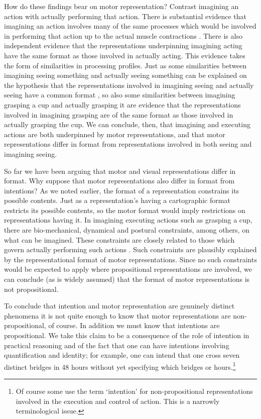 \documentclass[12pt,\papersize]{extarticle}
\begin{document}
How do these findings bear on motor representation? Contrast imagining an action with actually performing that action. There is substantial evidence that imagining an action involves many of the same processes which would be involved in performing that action up to the actual muscle contractions \citep{jeannerod:1995_mental,jeannerod:2003_mechanism}. There is also independent evidence that the representations underpinning imagining acting have the same format as those involved in actually acting. This evidence takes the form of similarities in processing profiles. Just as some similarities between imagining seeing something and actually seeing something can be explained on the hypothesis that the representations involved in imagining seeing and actually seeing have a common format \citep{kosslyn:1994_image}, so also some similarities between imagining grasping a cup and actually grasping it are evidence that the representations involved in imagining grasping are of the same format as those involved in actually grasping the cup. We can conclude, then, that imagining and executing actions are both underpinned by motor representations, and that motor representations differ in format from representations involved in both seeing and imagining seeing. 

So far we have been arguing that motor and visual representations differ in format.  Why suppose that motor representations also differ in format from intentions?  As we noted earlier, the format of a representation constrains its possible contents. Just as a representation's having a cartographic format restricts its possible contents, so the motor format would imply restrictions on representations having it. In imagining executing actions such as grasping a cup, there are bio-mechanical, dynamical and postural constraints, among others, on what can be imagined. These constraints are closely related to those which govern actually performing such actions \citep{Jeannerod:2001yb}. Such constraints are plausibly explained by the representational format of motor representations. Since no such constraints would be expected to apply where propositional representations are involved, we can conclude (as is widely assumed) that the format of motor representations is not propositional.

To conclude that intention and motor representation are genuinely distinct phenomena it is not quite enough to know that motor representations are non-propositional, of course. In addition we must know that intentions are propositional. We take this claim to be a consequence of the role of intention in practical reasoning and of the fact that one can have intentions involving quantification and identity; for example, one can intend that one cross seven distinct bridges in 48 hours without yet specifying which bridges or hours.\footnote{ Of course some use the term `intention' for non-propositional representations involved in the execution and control of action.  This is a narrowly terminological issue.} 
\end{document}
